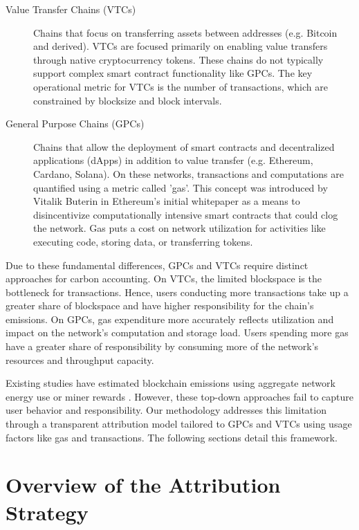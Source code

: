 \documentclass[11pt]{report}
\begin{document}
\begin{description}
    \item[Value Transfer Chains (VTCs)] Chains that focus on transferring assets between addresses (e.g. Bitcoin and derived). VTCs are focused primarily on enabling value transfers through native cryptocurrency tokens. These chains do not typically support complex smart contract functionality like GPCs. The key operational metric for VTCs is the number of transactions, which are constrained by blocksize and block intervals.
    \item[General Purpose Chains (GPCs)] Chains that allow the deployment of smart contracts and decentralized applications (dApps) in addition to value transfer (e.g. Ethereum, Cardano, Solana). On these networks, transactions and computations are quantified using a metric called 'gas'. This concept was introduced by Vitalik Buterin in Ethereum's initial whitepaper \cite{buterinEthereumNextgenerationSmart} as a means to disincentivize computationally intensive smart contracts that could clog the network. Gas puts a cost on network utilization for activities like executing code, storing data, or transferring tokens.
\end{description}

Due to these fundamental differences, GPCs and VTCs require distinct approaches for carbon accounting. On VTCs, the limited blockspace is the bottleneck for transactions. Hence, users conducting more transactions take up a greater share of blockspace and have higher responsibility for the chain's emissions. On GPCs, gas expenditure more accurately reflects utilization and impact on the network's computation and storage load. Users spending more gas have a greater share of responsibility by consuming more of the network's resources and throughput capacity.

Existing studies have estimated blockchain emissions using aggregate network energy use or miner rewards \cite{devriesCryptocurrenciesRoadSustainability2022,devriesRevisitingBitcoinCarbon2022,neumuellerCambridgeBitcoinElectricity2021,mcdonaldEthereumEmissionsBottomup2022}. However, these top-down approaches fail to capture user behavior and responsibility. Our methodology addresses this limitation through a transparent attribution model tailored to GPCs and VTCs using usage factors like gas and transactions. The following sections detail this framework.

\section{Overview of the Attribution Strategy}
\end{document}
